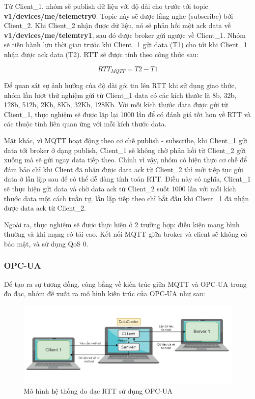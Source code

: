 Từ Client\_1, nhóm sẽ publish dữ liệu với độ dài cho trước tới topic \textbf{v1/devices/me/telemetry0}. Topic này sẽ được lắng nghe (subscribe) bởi Client\_2. Khi Client\_2 nhận được dữ liệu, nó sẽ phản hồi một ack data về \textbf{v1/devices/me/telemtry1}, sau đó được broker gửi ngược về Client\_1. Nhóm sẽ tiến hành lưu thời gian trước khi Client\_1 gửi data (T1) cho tới khi Client\_1 nhận được ack data (T2). RTT sẽ được tính theo công thức sau:

\begin{equation}
    RTT_{MQTT} = T2 - T1
\end{equation}

Để quan sát sự ảnh hưởng của độ dài gói tin lên RTT khi sử dụng giao thức, nhóm lần lượt thử nghiệm gửi từ Client\_1 data có các kích thước là 8b, 32b, 128b, 512b, 2Kb, 8Kb, 32Kb, 128Kb. Với mỗi kích thước data được gửi từ Client\_1, thực nghiệm sẽ được lặp lại 1000 lần để có đánh giá tốt hơn về RTT và các thuộc tính liên quan ứng với mỗi kích thước data. 

Mặt khác, vì MQTT hoạt động theo cơ chế publish - subscribe, khi Client\_1 gửi data tới broker ở dạng publish, Client\_1 sẽ không chờ phản hồi từ Client\_2 gửi xuống mà sẽ gửi ngay data tiếp theo. Chính vì vậy, nhóm có hiện thực cơ chế để đảm bảo chỉ khi Client đã nhận được data ack từ Client\_2 thì mới tiếp tục gửi data ở lần lặp sau để có thể dễ dàng tính toán RTT. Điều này có nghĩa, Client\_1 sẽ thực hiện gửi data và chờ data ack từ Client\_2 suốt 1000 lần với mỗi kích thước data một cách tuần tự, lần lặp tiếp theo chỉ bắt đầu khi Client\_1 đã nhận được data ack từ Client\_2.

Ngoài ra, thực nghiệm sẽ được thực hiện ở 2 trường hợp: điều kiện mạng bình thường và khi mạng có tải cao. Kết nối MQTT giữa broker và client sẽ không có bảo mật, và sử dụng QoS 0.

\subsubsection{OPC-UA}
Để tạo ra sự tương đồng, công bằng về kiến trúc giữa MQTT và OPC-UA trong đo đạc, nhóm đề xuất ra mô hình kiến trúc của OPC-UA như sau:

\begin{figure}[!h]
    \centering
    \includegraphics[width=\textwidth]{Images/Comparing_experiment/opcua-architecture.jpg}
    \caption{Mô hình hệ thống đo đạc RTT sử dụng OPC-UA}
    \label{fig:comp_opcua}
\end{figure}

